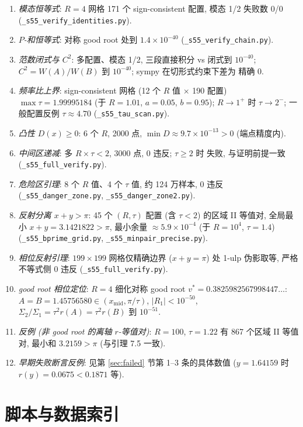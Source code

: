 \documentclass[UTF8]{ctexart}
\begin{document}
\begin{enumerate}
	\item \emph{模态恒等式}: $R=4$ 网格 171 个 sign-consistent 配置, 模态 1/2
		失败数 0/0 (\texttt{\_s55\_verify\_identities.py}).
	\item \emph{$P$-和恒等式}: 对称 good root 处到 $1.4\times10^{-40}$
		(\texttt{\_s55\_verify\_chain.py}).
	\item \emph{范数闭式与 $C^2$}: 多配置、模态 1/2, 三段直接积分 vs 闭式到
		$10^{-40}$; $C^2=W(A)/W(B)$ 到 $10^{-40}$; sympy 在切形式约束下差为
		精确 $0$.
	\item \emph{频率比上界}: sign-consistent 网格 (12 个 $R$ 值 $\times$ 190 配置)
		$\max\tau=1.99995184$ (于 $R=1.01$, $a=0.05$, $b=0.95$); $R\to1^+$ 时
		$\tau\to2^-$; 一般配置反例 $\tau\approx4.70$ (\texttt{\_s55\_tau\_scan.py}).
	\item \emph{凸性 $D(x)\ge0$}: 6 个 $R$, 2000 点,
		$\min D\approx9.7\times10^{-13}>0$ (端点精度内).
	\item \emph{中间区递减}: 多 $R\times\tau<2$, 3000 点, 0 违反; $\tau\ge2$ 时
		失败, 与证明前提一致 (\texttt{\_s55\_full\_verify.py}).
	\item \emph{危险区引理}: 8 个 $R$ 值、4 个 $\tau$ 值, 约 124 万样本,
		0 违反 (\texttt{\_s55\_danger\_zone.py}, \texttt{\_s55\_danger\_zone2.py}).
	\item \emph{反射分离 $x+y>\pi$}: 45 个 $(R,\tau)$ 配置 (含 $\tau<2$) 的区域 II
		等值对, 全局最小 $x+y=3.1421822>\pi$, 最小余量 $\approx5.9\times10^{-4}$
		(于 $R=10^4$, $\tau=1.4$) (\texttt{\_s55\_bprime\_grid.py},
		\texttt{\_s55\_minpair\_precise.py}).
	\item \emph{相位反射引理}: $199\times199$ 网格仅精确边界 ($x+y=\pi$)
		处 1-ulp 伪影取等, 严格不等式侧 0 违反 (\texttt{\_s55\_full\_verify.py}).
	\item \emph{good root 相位定位}: $R=4$ 细化对称 good root
		$v^*=0.3825982567998447\ldots$: $A=B=1.45756580\in(x_{\mathrm{mid}},\pi/\tau)$,
		$|R_1|<10^{-50}$, $\Sigma_2/\Sigma_1=\tau^2r(A)=\tau^2r(B)$ 到 $10^{-51}$.
	\item \emph{反例 (非 good root 的离轴 $r$-等值对)}: $R=100$, $\tau=1.22$ 有
		867 个区域 II 等值对, 最小和 $3.2159>\pi$ (与引理 7.5 一致).
	\item \emph{早期失败断言反例}: 见第 \ref{sec:failed} 节第 1--3 条的具体数值
		($y=1.64159$ 时 $r(y)=0.0675<0.1871$ 等).
\end{enumerate}

\section{脚本与数据索引}
\end{document}
